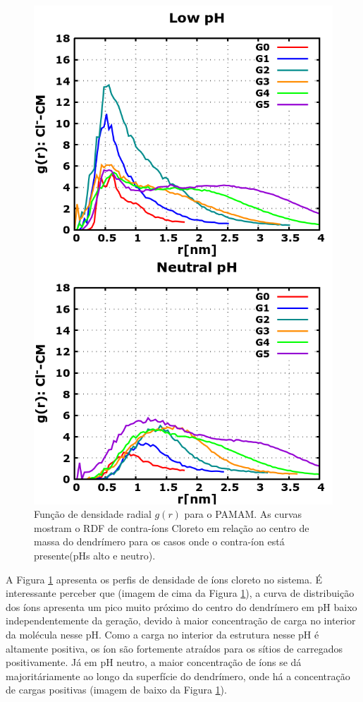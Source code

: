 \begin{figure}[ht!]
\centering
\includegraphics[scale=0.3]{images/PAMAMClRDF.png}
\caption{Função de densidade radial $g(r)$ para o PAMAM. As curvas mostram o RDF de contra-íons Cloreto em relação ao centro de massa do dendrímero para os casos onde o contra-íon está presente(pHs alto e neutro).}
\label{fig:PAMAMClRDF}
\end{figure}

A Figura \ref{fig:PAMAMClRDF} apresenta os perfis de densidade de íons cloreto no sistema.
É interessante perceber que (imagem de cima da Figura \ref{fig:PAMAMClRDF}), a curva de distribuição dos íons apresenta um pico muito próximo do centro do dendrímero em pH baixo independentemente da geração, devido à maior concentração de carga no interior da molécula nesse pH.
Como a carga no interior da estrutura nesse pH é altamente positiva, os íon são fortemente atraídos para os sítios de carregados positivamente.
Já em pH neutro, a maior concentração de íons se dá majoritáriamente ao longo da superfície do dendrímero, onde há a concentração de cargas positivas (imagem de baixo da Figura \ref{fig:PAMAMClRDF}).

